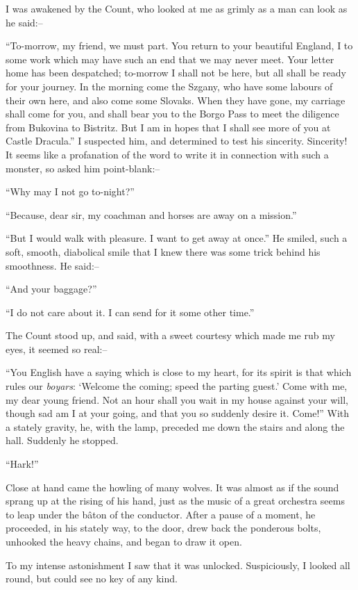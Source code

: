 \documentclass[12pt,openright]{book}
\begin{document}
I was awakened by the Count, who looked at me as grimly as a man can look as he said:–

“To-morrow, my friend, we must part. You return to your beautiful England, I to some work which may have such an end that we may never meet. Your letter home has been despatched; to-morrow I shall not be here, but all shall be ready for your journey. In the morning come the Szgany, who have some labours of their own here, and also come some Slovaks. When they have gone, my carriage shall come for you, and shall bear you to the Borgo Pass to meet the diligence from Bukovina to Bistritz. But I am in hopes that I shall see more of you at Castle Dracula.” I suspected him, and determined to test his sincerity. Sincerity! It seems like a profanation of the word to write it in connection with such a monster, so asked him point-blank:–

“Why may I not go to-night?”

“Because, dear sir, my coachman and horses are away on a mission.”

“But I would walk with pleasure. I want to get away at once.” He smiled, such a soft, smooth, diabolical smile that I knew there was some trick behind his smoothness. He said:–

“And your baggage?”

“I do not care about it. I can send for it some other time.”

The Count stood up, and said, with a sweet courtesy which made me rub my eyes, it seemed so real:–

“You English have a saying which is close to my heart, for its spirit is that which rules our \textit{boyars}: ‘Welcome the coming; speed the parting guest.’ Come with me, my dear young friend. Not an hour shall you wait in my house against your will, though sad am I at your going, and that you so suddenly desire it. Come!” With a stately gravity, he, with the lamp, preceded me down the stairs and along the hall. Suddenly he stopped.

“Hark!”

Close at hand came the howling of many wolves. It was almost as if the sound sprang up at the rising of his hand, just as the music of a great orchestra seems to leap under the bâton of the conductor. After a pause of a moment, he proceeded, in his stately way, to the door, drew back the ponderous bolts, unhooked the heavy chains, and began to draw it open.

To my intense astonishment I saw that it was unlocked. Suspiciously, I looked all round, but could see no key of any kind.
\end{document}
